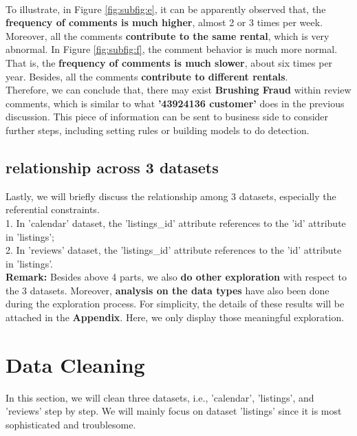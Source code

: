 \documentclass{article}
\begin{document}
	\\
	To illustrate, in Figure \ref{fig:subfig:e}, it can be apparently observed that, the\textbf{ frequency of comments is much higher}, almost 2 or 3 times per week. Moreover, all the comments \textbf{contribute to the same rental}, which is very abnormal. In Figure \ref{fig:subfig:f}, the comment behavior is much more normal. That is, the \textbf{frequency of comments is much slower}, about six times per year. Besides, all the comments \textbf{contribute to different rentals}.
	\vspace{3pt}
	\\
	Therefore, we can conclude that, there may exist \textbf{Brushing Fraud} within review comments, which is similar to what \textbf{'43924136 customer' }does in the previous discussion. This piece of information can be sent to business side to consider further steps, including setting rules or building models to do detection.
	\subsection{relationship across 3 datasets}
	Lastly, we will briefly discuss the relationship among 3 datasets, especially the referential constraints. 
	\vspace{3pt}
	\\
	1. In 'calendar' dataset, the 'listings\_id' attribute references to the 'id' attribute in 'listings';
	\\
	2. In 'reviews' dataset, the 'listings\_id' attribute references to the 'id' attribute in 'listings'. 
	\vspace{5pt}
	\\
	\textbf{Remark:} Besides above 4 parts, we also \textbf{do other exploration }with respect to the 3 datasets. Moreover, \textbf{analysis on the data types} have also been done during the exploration process. For simplicity, the details of these results will be attached in the \textbf{Appendix}. Here, we only display those meaningful exploration.
	
	\section{Data Cleaning}
	In this section, we will clean three datasets, i.e., 'calendar', 'listings', and 'reviews' step by step. We will mainly focus on dataset 'listings' since it is most sophisticated and troublesome.  
	
\end{document}
